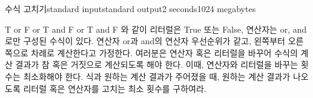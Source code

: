 \begin{problem}{수식 고치기}{standard input}{standard output}{2 seconds}{1024 megabytes}

T or F or T and F or T and F
와 같이 리터럴은 True 또는 False, 연산자는 or, and로만 구성된 수식이 있다. 연산자 or과 and의 연산자 우선순위가 같고, 왼쪽부터 오른쪽으로 차례로 계산한다고 가정한다. 여러분은 연산자 혹은 리터럴을 바꾸어 수식의 계산 결과가 참 혹은 거짓으로 계산되도록 해야 한다. 이때, 연산자와 리터럴을 바꾸는 횟수는 최소화해야 한다. 식과 원하는 계산 결과가 주어졌을 때, 원하는 계산 결과가 나오도록 리터럴 혹은 연산자를 고치는 최소 횟수를 구하여라.


\Examples

\begin{example}
%
%
%
%
%
%
\end{example}

\end{problem}

